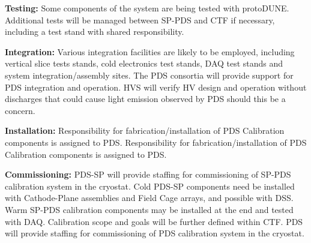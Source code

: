 \textbf{Testing: }Some components of the system are being tested with protoDUNE. Additional tests will be managed between SP-PDS and CTF if necessary, including a test stand with shared responsibility.

\textbf{Integration: } Various integration facilities are likely to be employed, including vertical slice tests stands, cold electronics test stands, DAQ test stands and system integration/assembly sites. The PDS consortia will provide support for PDS integration and operation. HVS will verify HV design and operation without discharges that could cause light emission observed by PDS should this be a concern.

\textbf{Installation: }Responsibility for fabrication/installation of PDS Calibration components is assigned to PDS. Responsibility for fabrication/installation of PDS Calibration components is assigned to PDS.

\textbf{Commissioning:} PDS-SP will provide staffing for commissioning of SP-PDS calibration system in the cryostat. Cold PDS-SP components need be installed with Cathode-Plane assemblies and Field Cage arrays, and possible with DSS. Warm SP-PDS calibration components may be installed at the end and tested with DAQ. Calibration scope and goals will be further defined within CTF. PDS will provide staffing for commissioning of PDS calibration system in the cryostat.






